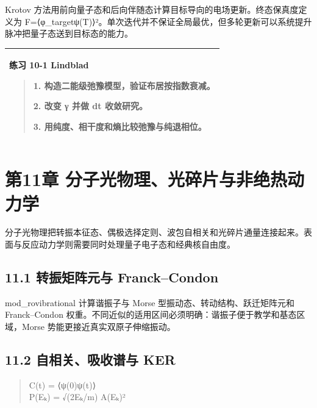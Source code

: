 \documentclass[UTF8,openany,11pt,fontset=fandol]{ctexbook}
\begin{document}
Krotov
方法用前向量子态和后向伴随态计算目标导向的电场更新。终态保真度定义为
F=\textbar⟨φ\_target\textbar ψ(T)⟩\textbar²。单次迭代并不保证全局最优，但多轮更新可以系统提升脉冲把量子态送到目标态的能力。

\begin{longtable}[]{@{}l@{}}
\toprule
\endhead
\begin{minipage}[t]{0.97\columnwidth}\raggedright
\textbf{练习 10-1 Lindblad}

\begin{quote}
1. 构造二能级弛豫模型，验证布居按指数衰减。

2. 改变 γ 并做 dt 收敛研究。

3. 用纯度、相干度和熵比较弛豫与纯退相位。
\end{quote}\strut
\end{minipage}\tabularnewline
\bottomrule
\end{longtable}

\chapter{第11章 分子光物理、光碎片与非绝热动力学}\label{ux7b2c11ux7ae0-ux5206ux5b50ux5149ux7269ux7406ux5149ux788eux7247ux4e0eux975eux7eddux70edux52a8ux529bux5b66}

分子光物理把转振本征态、偶极选择定则、波包自相关和光碎片通量连接起来。表面与反应动力学则需要同时处理量子电子态和经典核自由度。

\section{\texorpdfstring{\textbf{11.1 转振矩阵元与
Franck--Condon}}{11.1 转振矩阵元与 Franck--Condon}}\label{ux8f6cux632fux77e9ux9635ux5143ux4e0e-franckcondon}

mod\_rovibrational 计算谐振子与 Morse 型振动态、转动结构、跃迁矩阵元和
Franck--Condon
权重。不同近似的适用区间必须明确：谐振子便于教学和基态区域，Morse
势能更接近真实双原子伸缩振动。

\section{\texorpdfstring{\textbf{11.2 自相关、吸收谱与
KER}}{11.2 自相关、吸收谱与 KER}}\label{ux81eaux76f8ux5173ux5438ux6536ux8c31ux4e0e-ker}

\begin{quote}
C(t) = ⟨ψ(0)\textbar ψ(t)⟩\\
P(Eₖ) = √(2Eₖ/m) \textbar A(Eₖ)\textbar²
\end{quote}
\end{document}
